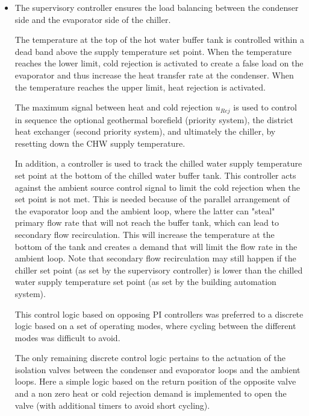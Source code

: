 \begin{itemize}
    \item The supervisory controller ensures the load balancing between the condenser side and the evaporator side of the chiller.

    The temperature at the top of the hot water buffer tank is controlled within a dead band above the supply temperature set point.
    When the temperature reaches the lower limit, cold rejection is activated to create a false load on the evaporator and thus increase the heat transfer rate at the condenser.
    When the temperature reaches the upper limit, heat rejection is activated.

    The maximum signal between heat and cold rejection $u_{Rej}$ is used to control in sequence the optional geothermal borefield (priority system), the district heat exchanger (second priority system), and ultimately the chiller, by resetting down the CHW supply temperature.

    In addition, a controller is used to track the chilled water supply temperature set point at the bottom of the chilled water buffer tank. This controller acts against the ambient source control signal to limit the cold rejection when the set point is not met. This is needed because of the parallel arrangement of the evaporator loop and the ambient loop, where the latter can "steal" primary flow rate that will not reach the buffer tank, which can lead to secondary flow recirculation. This will increase the temperature at the bottom of the tank and creates a demand that will limit the flow rate in the ambient loop. Note that secondary flow recirculation may still happen if the chiller set point (as set by the supervisory controller) is lower than the chilled water supply temperature set point (as set by the building automation system).

    This control logic based on opposing PI controllers was preferred to a discrete logic based on a set of operating modes, where cycling between the different modes was difficult to avoid.

    The only remaining discrete control logic pertains to the actuation of the isolation valves between the condenser and evaporator loops and the ambient loops. Here a simple logic based on the return position of the opposite valve and a non zero heat or cold rejection demand is implemented to open the valve (with additional timers to avoid short cycling).


\end{itemize}
